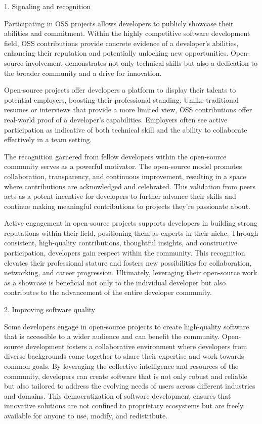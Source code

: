 1. Signaling and recognition

Participating in OSS projects allows developers to publicly showcase their abilities and commitment. Within the highly competitive software development field,  OSS contributions provide concrete evidence of a developer's abilities, enhancing their reputation and potentially unlocking new opportunities.  Open-source involvement demonstrates not only technical skills but also a dedication to the broader community and a drive for innovation.

Open-source projects offer developers a platform to display their talents to potential employers, boosting their professional standing. Unlike traditional resumes or interviews that provide a more limited view, OSS contributions offer real-world proof of a developer's capabilities. Employers often see active participation as indicative of both technical skill and the ability to collaborate effectively in a team setting.

The recognition garnered from fellow developers within the open-source community serves as a powerful motivator. The open-source model promotes collaboration, transparency, and continuous improvement, resulting in a space where contributions are acknowledged and celebrated. This validation from peers acts as a potent incentive for developers to further advance their skills and continue making meaningful contributions to projects they're passionate about.

Active engagement in open-source projects supports developers in building strong reputations within their field, positioning them as experts in their niche. Through consistent, high-quality contributions, thoughtful insights, and constructive participation, developers gain respect within the community. This recognition elevates their professional stature and fosters new possibilities for collaboration, networking, and career progression. Ultimately, leveraging their open-source work as a showcase is beneficial not only to the individual developer but also contributes to the advancement of the entire developer community.

2. Improving software quality

Some developers engage in open-source projects to create high-quality software that is accessible to a wider audience and can benefit the community. Open-source development fosters a collaborative environment where developers from diverse backgrounds come together to share their expertise and work towards common goals. By leveraging the collective intelligence and resources of the community, developers can create software that is not only robust and reliable but also tailored to address the evolving needs of users across different industries and domains. This democratization of software development ensures that innovative solutions are not confined to proprietary ecosystems but are freely available for anyone to use, modify, and redistribute.

